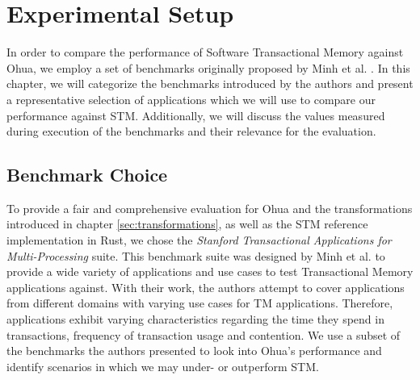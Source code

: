 %
\chapter{Experimental Setup}
\label{sec:experiments}

In order to compare the performance of Software Transactional Memory against Ohua, we employ a set of benchmarks originally proposed by Minh et al. \cite{minh2008stamp}.
In this chapter, we will categorize the benchmarks introduced by the authors and present a representative selection of applications which we will use to compare our performance against STM.
Additionally, we will discuss the values measured during execution of the benchmarks and their relevance for the evaluation.

\section{Benchmark Choice}


To provide a fair and comprehensive evaluation for Ohua and the transformations introduced in chapter \ref{sec:transformations}, as well as the STM reference implementation in Rust, we chose the \emph{Stanford Transactional Applications for Multi-Processing} suite.
This benchmark suite was designed by Minh et al. to provide a wide variety of applications and use cases to test Transactional Memory applications against.
With their work, the authors attempt to cover applications from different domains with varying use cases for TM applications.
Therefore, applications exhibit varying characteristics regarding the time they spend in transactions, frequency of transaction usage and contention.
We use a subset of the benchmarks the authors presented to look into Ohua's performance and identify scenarios in which we may under- or outperform STM.




